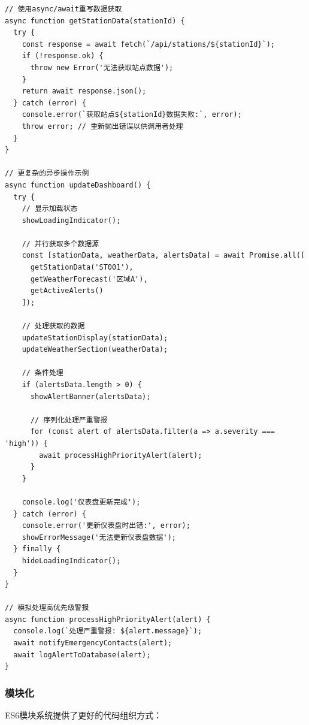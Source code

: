 \begin{lstlisting}
// 使用async/await重写数据获取
async function getStationData(stationId) {
  try {
    const response = await fetch(`/api/stations/${stationId}`);
    if (!response.ok) {
      throw new Error('无法获取站点数据');
    }
    return await response.json();
  } catch (error) {
    console.error(`获取站点${stationId}数据失败:`, error);
    throw error; // 重新抛出错误以供调用者处理
  }
}

// 更复杂的异步操作示例
async function updateDashboard() {
  try {
    // 显示加载状态
    showLoadingIndicator();
    
    // 并行获取多个数据源
    const [stationData, weatherData, alertsData] = await Promise.all([
      getStationData('ST001'),
      getWeatherForecast('区域A'),
      getActiveAlerts()
    ]);
    
    // 处理获取的数据
    updateStationDisplay(stationData);
    updateWeatherSection(weatherData);
    
    // 条件处理
    if (alertsData.length > 0) {
      showAlertBanner(alertsData);
      
      // 序列化处理严重警报
      for (const alert of alertsData.filter(a => a.severity === 'high')) {
        await processHighPriorityAlert(alert);
      }
    }
    
    console.log('仪表盘更新完成');
  } catch (error) {
    console.error('更新仪表盘时出错:', error);
    showErrorMessage('无法更新仪表盘数据');
  } finally {
    hideLoadingIndicator();
  }
}

// 模拟处理高优先级警报
async function processHighPriorityAlert(alert) {
  console.log(`处理严重警报: ${alert.message}`);
  await notifyEmergencyContacts(alert);
  await logAlertToDatabase(alert);
}
\end{lstlisting}

\subsubsection{模块化}\label{ux6a21ux5757ux5316}

ES6模块系统提供了更好的代码组织方式：

